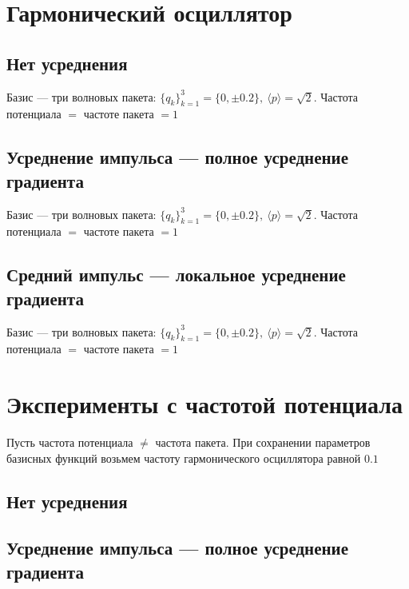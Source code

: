 \documentclass[a4paper,14pt]{extarticle}
\begin{document}
\section{Гармонический осциллятор}

\subsection{Нет усреднения}


Базис --- три волновых пакета: $\{q_k\}_{k=1}^3 = \{0, \pm 0.2\},\ \langle p\rangle = \sqrt{2}$.
Частота потенциала $=$ частоте пакета $= 1$



\newpage

\subsection{Усреднение импульса --- полное усреднение градиента}


Базис --- три волновых пакета: $\{q_k\}_{k=1}^3 = \{0, \pm 0.2\},\ \langle p\rangle = \sqrt{2}$.
Частота потенциала $=$ частоте пакета $= 1$


\newpage

\subsection{Средний импульс --- локальное усреднение градиента}


Базис --- три волновых пакета: $\{q_k\}_{k=1}^3 = \{0, \pm 0.2\},\ \langle p\rangle = \sqrt{2}$.
Частота потенциала $=$ частоте пакета $= 1$


\newpage

\section{Эксперименты с частотой потенциала}
Пусть частота потенциала $\neq$ частота пакета. 
При сохранении параметров базисных функций возьмем частоту гармонического осциллятора равной $0.1$

\subsection{Нет усреднения}

\newpage

\subsection{Усреднение импульса --- полное усреднение градиента}

\newpage
\end{document}
